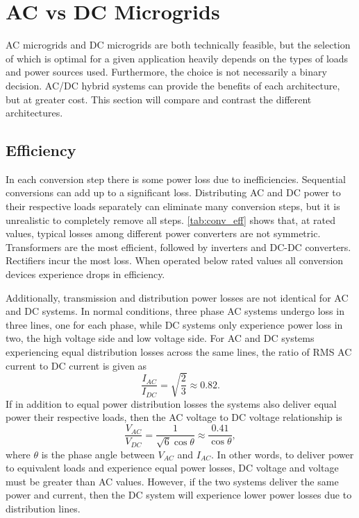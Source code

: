 
\section{AC vs DC Microgrids}
AC microgrids and DC microgrids are both technically feasible, but the selection of which is optimal for a given application heavily depends on the types of loads and power sources used. Furthermore, the choice is not necessarily a binary decision. AC\slash DC hybrid systems can provide the benefits of each architecture, but at greater cost. This section will compare and contrast the different architectures.

\subsection{Efficiency}
In each conversion step there is some power loss due to inefficiencies. Sequential conversions can add up to a significant loss. Distributing AC and DC power to their respective loads separately can eliminate many conversion steps, but it is unrealistic to completely remove all steps. \autoref{tab:conv_eff} shows that, at rated values, typical losses among different power converters are not symmetric. Transformers are the most efficient, followed by inverters and DC-DC converters. Rectifiers incur the most loss. When operated below rated values all conversion devices experience drops in efficiency.
 

Additionally, transmission and distribution power losses are not identical for AC and DC systems. In normal conditions, three phase AC systems undergo loss in three lines, one for each phase, while DC systems only experience power loss in two, the high voltage side and low voltage side. For AC and DC systems experiencing equal distribution losses across the same lines, the ratio of RMS AC current to DC current is given as \cite{Starke2008}
\begin{equation}
\frac{I_{AC}}{I_{DC}} = \sqrt{\frac{2}{3}} \approx 0.82.
\end{equation}
If in addition to equal power distribution losses the systems also deliver equal power their respective loads, then the AC voltage to DC voltage relationship is
\begin{equation}
\frac{V_{AC}}{V_{DC}} = \frac{1}{\sqrt{6}\cos{\theta}} \approx \frac{0.41}{\cos{\theta}} ,
\end{equation}
where $\theta$ is the phase angle between $V_{AC}$ and $I_{AC}$. In other words, to deliver power to equivalent loads and experience equal power losses, DC voltage and voltage must be greater than AC values. However, if the two systems deliver the same power and current, then the DC system will experience lower power losses due to distribution lines.


